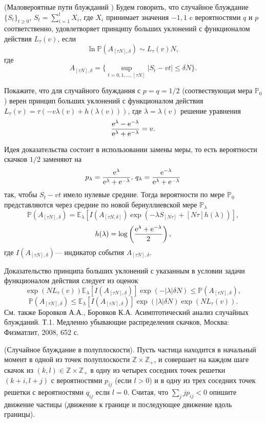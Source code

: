 \begin{problem}(Маловероятные пути блужданий \cite{27}) Будем говорить, что случайное  блуждание $\{S_t\}_{t\geq 0}$, $S_t = \sum_{i=1}^t X_i$, где
$X_i$ принимает значения ${-1,1}$ c вероятностями $q$ и $p$ соответственно, 
удовлетворяет принципу больших уклонений с функционалом действия $L_{\tau}(v)$, если
$$
\ln \mathbb{P}(A_{[\tau N],\delta})\sim L_{\tau}(v)N,
$$
где 
$$
A_{[\tau N],\delta} = \bigg\{\sup_{t=0,1,\dots,[\tau N]}|S_t-vt|\leq \delta N\biggr\}.
$$

Покажите, что для случайного блуждания с  $p=q=1/2$ (соотвествующая мера $\mathbb{P}_{0}$) верен принцип больших уклонений с функционалом действия  $L_{\tau}(v) = \tau (-v\lambda(v)+h(\lambda(v)))$,
где $\lambda=\lambda(v)$ решение уравнения 
$$
\frac{{\rm e}^{\lambda}-{\rm e}^{-\lambda}}{{\rm e}^{\lambda}+{\rm e}^{-\lambda}}=v.
$$
\end{problem}
\begin{remark}
Идея доказательства состоит в использовании замены меры, то есть вероятности скачков $1/2$ заменяют на
$$
p_{\lambda} = \frac{{\rm e}^{\lambda}}{{\rm e}^{\lambda}+{\rm e}^{-\lambda}},\,
q_{\lambda} = \frac{{\rm e}^{-\lambda}}{{\rm e}^{\lambda}+{\rm e}^{-\lambda}}
$$
так, чтобы $S_t-vt$ имело нулевые средние. Тогда вероятности по мере $\mathbb{P}_{0}$ представляются через средние по новой бернуллиевской мере $\mathbb{P}_{\lambda}$
$$
\mathbb{P}(A_{[\tau N],\delta}) = \mathbb{E}_{\lambda}[I(A_{[\tau N,\delta]})\exp(-\lambda S_{[N\tau]}+[N\tau]h(\lambda))],
$$
$$
h(\lambda) = \log\left(\frac{{\rm e}^{\lambda}+{\rm e}^{-\lambda}}{2}\right),
$$
где  $I(A_{[\tau N],\delta})$--- индикатор события $A_{[\tau N],\delta}$.

Доказательство принципа больших уклонений с указанным в условии задачи функционалом действия следует из оценок 
$$
\exp(N L_{\tau}(v))\mathbb{E}_{\lambda}[I(A_{[\tau N],\delta})]\exp(-|\lambda|\delta N)\leq \mathbb{P}(A_{[\tau N],\delta}), 
$$
$$
\mathbb{P}(A_{[\tau N],\delta}) \leq \mathbb{E}_{\lambda}[I(A_{[\tau N],\delta})]\exp(|\lambda|\delta N)\exp(N L_{\tau}(v)).
$$
См. также  Боровков А.А., Боровков К.А. Асимптотический анализ случайных блужданий.  Т.1. Медленно убывающие распределения скачков, Москва: Физматлит, 2008, 652 с.
\end{remark}

\begin{problem}(Случайное блуждание в полуплоскости). Пусть частица находится в начальный момент в одной из точек полуплоскости $\mathbb{Z}\times\mathbb{Z}_{+}$, и совершает на каждом шаге скачок из $(k,l)\in \mathbb{Z}\times\mathbb{Z}_{+}$ в одну из четырех соседних точек решетки $(k+i,l+j)$ с вероятностями $p_{ij}$ (если $l>0$) и в одну из трех соседних точек решетки с вероятностями $q_{ij}$ если $l=0$. Считая, что $\sum_{j}jp_{ij}<0$ опишите движение частицы \cite{27} (движение к границе и последующее движение вдоль границы).
\end{problem}
